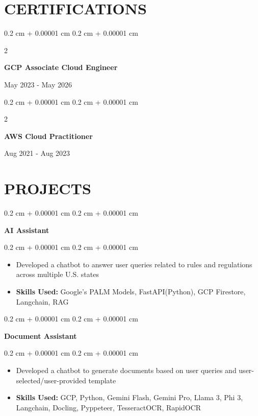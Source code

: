 \documentclass[10pt, letterpaper]{article}
\newenvironment{highlights}{
    \begin{itemize}[
        topsep=0.10 cm,
        parsep=0.10 cm,
        partopsep=0pt,
        itemsep=0pt,
        leftmargin=0.4 cm + 10pt
    ]
}{
    \end{itemize}
} %
\newenvironment{onecolentry}{
    \begin{adjustwidth}{
        0.2 cm + 0.00001 cm
    }{
        0.2 cm + 0.00001 cm
    }
}{
    \end{adjustwidth}
} %
\newenvironment{twocolentry}[2][]{
    \onecolentry
    \def\secondColumn{#2}
    \setcolumnwidth{\fill, 4.5 cm}
    \begin{paracol}{2}
}{
    \switchcolumn \raggedleft \secondColumn
    \end{paracol}
    \endonecolentry
} %
\begin{document}
    \section{CERTIFICATIONS}
        \begin{samepage}
            \begin{twocolentry}{
                May 2023 - May 2026
            }
                \textbf{GCP Associate Cloud Engineer}
                \vspace{0.10 cm}
            \end{twocolentry}
            \begin{twocolentry}{
                Aug 2021 - Aug 2023
            }
                \textbf{AWS Cloud Practitioner}
                \vspace{0.10 cm}
            \end{twocolentry}
        \end{samepage}

    \vspace{0.2 cm}
    
    \section{PROJECTS}

        \begin{onecolentry}
            \textbf{AI Assistant}
        \end{onecolentry}
        \vspace{0.10 cm}
        \begin{onecolentry}
            \begin{highlights}
                \item Developed a chatbot to answer user queries related to rules and regulations across multiple U.S. states
                \item \textbf{Skills Used:} Google's PALM Models, FastAPI(Python), GCP Firestore, Langchain, RAG
            \end{highlights}
        \end{onecolentry}

        \vspace{0.2 cm}

        \begin{onecolentry}
            \textbf{Document Assistant}
        \end{onecolentry}
        \vspace{0.10 cm}
        \begin{onecolentry}
            \begin{highlights}
                \item Developed a chatbot to generate documents based on user queries and user-selected/user-provided template
                \item \textbf{Skills Used:} GCP, Python, Gemini Flash, Gemini Pro, Llama 3, Phi 3, Langchain, Docling, Pyppeteer, TesseractOCR, RapidOCR
            \end{highlights}
        \end{onecolentry}
        
\end{document}

